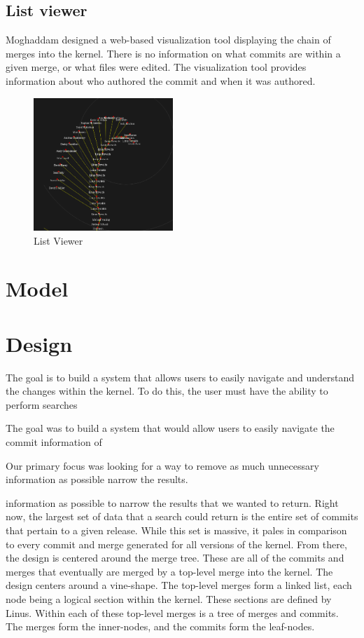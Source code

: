 \documentclass[conference, draftclsnofoot]{IEEEtran}
\begin{document}
\subsection{List viewer}
Moghaddam designed a web-based visualization tool displaying the chain of
merges into the kernel. There is no information on what commits are within a
given merge, or what files were edited. The visualization tool provides
information about who authored the commit and when it was authored.

\begin{figure}[h!]
	\centering
	\includegraphics[width=0.47\textwidth]{figures/gitvis.png}
	\caption{List Viewer}
	\label{fig:listviewer}
\end{figure}

\section{Model}

\section{Design}

The goal is to build a system that allows users to easily navigate and
understand the changes within the kernel. To do this, the user must have the
ability to perform searches

The goal was to build a system that would allow users to easily navigate the
commit information of

Our primary focus was looking for a way to remove as much unnecessary
information as possible narrow the results.


information as
possible to narrow the results that we wanted to return. Right now, the largest
set of data that a search could return is the entire set of commits that
pertain to a given release. While this set is massive, it pales in comparison
to every commit and merge generated for all versions of the kernel. From there,
the design is centered around the merge tree. These are all of the commits and
merges that eventually are merged by a top-level merge into the kernel. The
design centers around a vine-shape. The top-level merges form a linked list,
each node being a logical section within the kernel. These sections are defined
by Linus. Within each of these top-level merges is a tree of merges and
commits. The merges form the inner-nodes, and the commits form the leaf-nodes.
\end{document}
